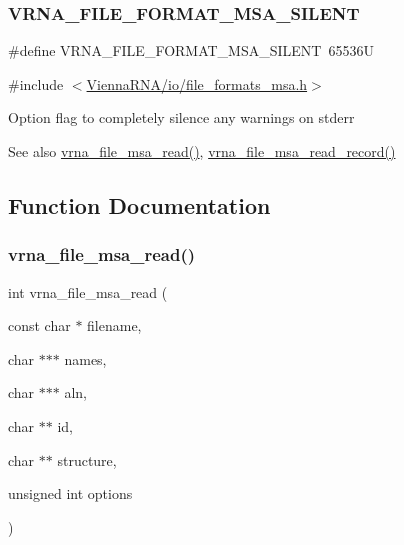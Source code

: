 \subsubsection{\texorpdfstring{VRNA\_FILE\_FORMAT\_MSA\_SILENT}{VRNA\_FILE\_FORMAT\_MSA\_SILENT}}
{\footnotesize\ttfamily \#define V\+R\+N\+A\+\_\+\+F\+I\+L\+E\+\_\+\+F\+O\+R\+M\+A\+T\+\_\+\+M\+S\+A\+\_\+\+S\+I\+L\+E\+NT~65536U}



{\ttfamily \#include $<$\mbox{\hyperlink{io_2file__formats__msa_8h}{Vienna\+R\+N\+A/io/file\+\_\+formats\+\_\+msa.\+h}}$>$}



Option flag to completely silence any warnings on {\ttfamily stderr} 

\begin{DoxySeeAlso}{See also}
\mbox{\hyperlink{group__file__formats__msa_gad02d5d12bda54611c915a1019323b7be}{vrna\+\_\+file\+\_\+msa\+\_\+read()}}, \mbox{\hyperlink{group__file__formats__msa_gad4203a438622b2df7bc2f16578d54799}{vrna\+\_\+file\+\_\+msa\+\_\+read\+\_\+record()}} 
\end{DoxySeeAlso}


\subsection{Function Documentation}
\mbox{\label{group__file__formats__msa_gad02d5d12bda54611c915a1019323b7be}} 
\subsubsection{\texorpdfstring{vrna\_file\_msa\_read()}{vrna\_file\_msa\_read()}}
{\footnotesize\ttfamily int vrna\+\_\+file\+\_\+msa\+\_\+read (\begin{DoxyParamCaption}\item[{const char $\ast$}]{filename,  }\item[{char $\ast$$\ast$$\ast$}]{names,  }\item[{char $\ast$$\ast$$\ast$}]{aln,  }\item[{char $\ast$$\ast$}]{id,  }\item[{char $\ast$$\ast$}]{structure,  }\item[{unsigned int}]{options }\end{DoxyParamCaption})}




